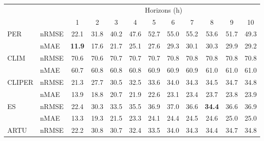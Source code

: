 \begin{table}[tb]
\begin{tabular}{@{}llcccccccccc@{}}\toprule
         &           & \multicolumn{10}{c}{Horizons (h)}                                                                                                                    \\  
         &           & 1             & 2             & 3             & 4             & 5             & 6             & 7             & 8             & 9             & 10            \\ \midrule
PER     & nRMSE     & 22.1          & 31.8          & 40.2          & 47.6          & 52.7          & 55.0          & 55.2          & 53.6          & 51.7          & 49.3          \\  
         & nMAE      & \textbf{11.9} & 17.6          & 21.7          & 25.1          & 27.6          & 29.3          & 30.1          & 30.3          & 29.9          & 29.2          \\ \addlinespace 
CLIM     & nRMSE     & 70.6          & 70.6          & 70.7          & 70.7          & 70.7          & 70.8          & 70.8          & 70.8          & 70.8          & 70.8          \\  
         & nMAE      & 60.7          & 60.8          & 60.8          & 60.8          & 60.9          & 60.9          & 60.9          & 61.0          & 61.0          & 61.0          \\ \addlinespace
CLIPER & nRMSE     & 21.3          & 27.7          & 30.5          & 32.5          & 33.6          & 34.0          & 34.3          & 34.5          & 34.7          & 34.8          \\  
         & nMAE      & 13.9          & 18.8          & 20.7          & 21.9          & 22.6          & 23.1          & 23.4          & 23.7          & 23.8          & 23.9          \\ \addlinespace 
ES       & nRMSE     & 22.4          & 30.3          & 33.5          & 35.5          & 36.9          & 37.0          & 36.6          & \textbf{34.4} & 36.6          & 36.9          \\  
         & nMAE      & 13.3          & 19.3          & 21.5          & 23.3          & 24.1          & 24.4          & 24.5          & 24.6          & 25.0          & 25.0          \\ \addlinespace 
ARTU     & nRMSE     & 22.2          & 30.8          & 30.7          & 32.4          & 33.5          & 34.0          & 34.3          & 34.4          & 34.7          & 34.8          \\  

\end{tabular}
\end{table}
